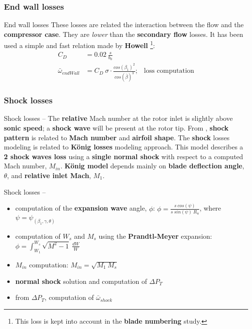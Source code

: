 \subsubsection{End wall losses}
	\begin{frame}{End wall losses}
		These losses are related the interaction between the flow and the \textbf{compressor case}. They are \textit{lower} than the \textbf{secondary flow} losses.
		\newline
		It has been used a simple and fast relation made by \textbf{Howell} \cite[Ch. 6]{axial2004}\footnote{This loss is kept into account in the \textbf{blade numbering} study.}:
		\begin{align}
			C_{D} & = 0.02 \ \frac{s}{b_{0}} \nonumber \\ 
			\bar{\omega}_{endWall} & = C_{D} \ \sigma \cdot \frac{cos( \beta_1 )^2}{cos( \bar{\beta} )^3}; & \text{loss computation} \nonumber 
		\end{align}		
	\end{frame}

\subsubsection{Shock losses}
	\begin{frame}{Shock losses -- }
		The \textbf{relative} Mach number at the rotor inlet is slightly above \textbf{sonic speed}; a \textbf{shock wave} will be present at the rotor tip. From \cite{manfredi2020transonic}, \textbf{shock pattern} is related to \textbf{Mach number} and \textbf{airfoil shape}.
		\newline
		\newline 
		The \textbf{shock} losses modeling is related to \textbf{K\"onig losses} modeling approach. This model describes a \textbf{2 shock waves loss} using a \textbf{single normal shock} with respect to a computed Mach number, $M_{in}$. 
		\newline
		\newline
		\textbf{K\"onig model} \cite[Sec. 6.7]{axial2004} depends mainly on \textbf{blade deflection angle}, $\theta$, and \textbf{relative inlet Mach}, $M_1$.
	\end{frame}
	
	\begin{frame}{Shock losses -- }
		\begin{itemize}
			\item computation of the \textbf{expansion wave} angle, $\phi$: $\phi = \frac{s \ cos(\psi)}{s \ sin(\psi) \ R_u}$, where $\psi = \psi_{(\beta_1, \gamma, \theta)}$
			\item computation of $W_s$ and $M_s$ using the \textbf{Prandtl-Meyer} expansion: $\phi = \int_{W_1}^{W_s} \sqrt{M^2 - 1} \ \frac{dW}{W}$
			\item $M_{in}$ computation: $M_{in} = \sqrt{M_1 \ M_s}$
			\item \textbf{normal shock} solution and computation of $\Delta P_T$
			\item from $\Delta P_T$, computation of $\bar{\omega}_{shock}$
		\end{itemize}
	\end{frame}

